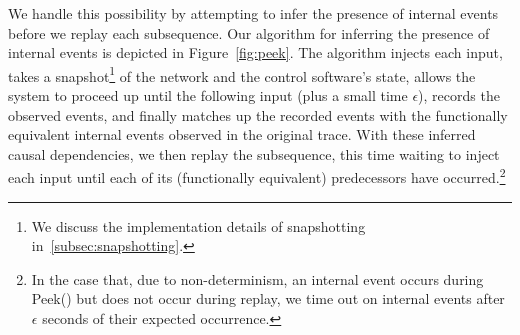 We handle this possibility by attempting to infer the presence of internal
events before we replay each subsequence. Our algorithm for inferring the
presence of internal events is depicted in
Figure~\ref{fig:peek}. The algorithm injects each input, takes a
snapshot\footnote{We discuss the implementation details of snapshotting
in~\ref{subsec:snapshotting}.} of
the network and the control software's state, allows the system to proceed up
until the following input (plus a small time $\epsilon$), records the observed
events, and finally matches up the
recorded events with the functionally equivalent internal events observed in
the original trace. With these inferred causal dependencies, we then replay
the subsequence, this time waiting to inject each input until each of its
(functionally equivalent) predecessors have occurred.\footnote{In the
case that, due
to non-determinism, an internal event occurs during Peek() but does not occur
during replay, we time out on internal events after $\epsilon$ seconds of
their expected occurrence.}



